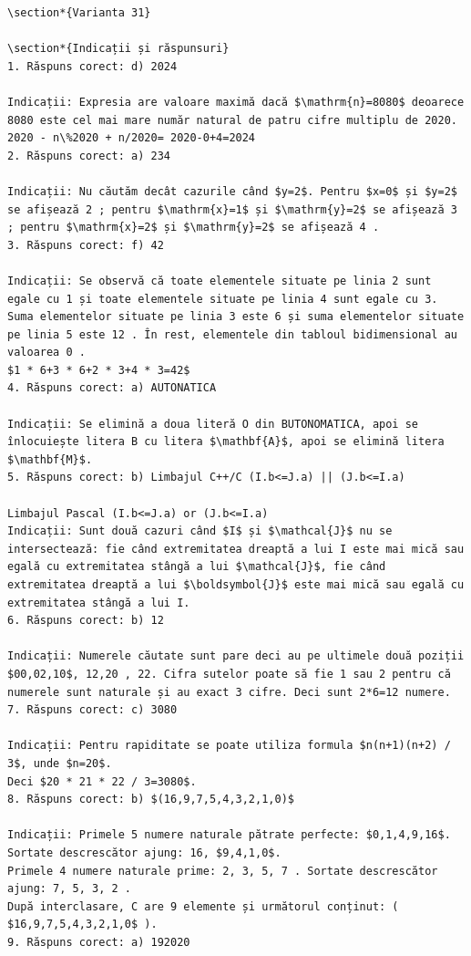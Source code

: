 \documentclass[10pt]{article}
\begin{document}
\begin{verbatim}
\section*{Varianta 31}

\section*{Indicații și răspunsuri}
1. Răspuns corect: d) 2024

Indicații: Expresia are valoare maximă dacă $\mathrm{n}=8080$ deoarece 8080 este cel mai mare număr natural de patru cifre multiplu de 2020.
2020 - n\%2020 + n/2020= 2020-0+4=2024
2. Răspuns corect: a) 234

Indicații: Nu căutăm decât cazurile când $y=2$. Pentru $x=0$ și $y=2$ se afișează 2 ; pentru $\mathrm{x}=1$ și $\mathrm{y}=2$ se afișează 3 ; pentru $\mathrm{x}=2$ și $\mathrm{y}=2$ se afișează 4 .
3. Răspuns corect: f) 42

Indicații: Se observă că toate elementele situate pe linia 2 sunt egale cu 1 și toate elementele situate pe linia 4 sunt egale cu 3. Suma elementelor situate pe linia 3 este 6 și suma elementelor situate pe linia 5 este 12 . În rest, elementele din tabloul bidimensional au valoarea 0 .
$1 * 6+3 * 6+2 * 3+4 * 3=42$
4. Răspuns corect: a) AUTONATICA

Indicații: Se elimină a doua literă O din BUTONOMATICA, apoi se înlocuiește litera B cu litera $\mathbf{A}$, apoi se elimină litera $\mathbf{M}$.
5. Răspuns corect: b) Limbajul C++/C (I.b<=J.a) || (J.b<=I.a)

Limbajul Pascal (I.b<=J.a) or (J.b<=I.a)
Indicații: Sunt două cazuri când $I$ și $\mathcal{J}$ nu se intersectează: fie când extremitatea dreaptă a lui I este mai mică sau egală cu extremitatea stângă a lui $\mathcal{J}$, fie când extremitatea dreaptă a lui $\boldsymbol{J}$ este mai mică sau egală cu extremitatea stângă a lui I.
6. Răspuns corect: b) 12

Indicații: Numerele căutate sunt pare deci au pe ultimele două poziții $00,02,10$, 12,20 , 22. Cifra sutelor poate să fie 1 sau 2 pentru că numerele sunt naturale și au exact 3 cifre. Deci sunt 2*6=12 numere.
7. Răspuns corect: c) 3080

Indicații: Pentru rapiditate se poate utiliza formula $n(n+1)(n+2) / 3$, unde $n=20$.
Deci $20 * 21 * 22 / 3=3080$.
8. Răspuns corect: b) $(16,9,7,5,4,3,2,1,0)$

Indicații: Primele 5 numere naturale pătrate perfecte: $0,1,4,9,16$. Sortate descrescător ajung: 16, $9,4,1,0$.
Primele 4 numere naturale prime: 2, 3, 5, 7 . Sortate descrescător ajung: 7, 5, 3, 2 .
După interclasare, C are 9 elemente și următorul conținut: ( $16,9,7,5,4,3,2,1,0$ ).
9. Răspuns corect: a) 192020


\end{verbatim}
\end{document}
